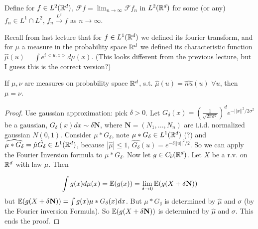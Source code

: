 \documentclass[a4paper]{article}
\begin{document}
Define for $f \in L^2 (\mathbb{R}^d)$, $\mathcal{F} f =\lim_{n \to \infty} \mathcal{F} f_n$ in $L^2(\mathbb{R}^d)$ for some (or any) $f_n \in L^1 \cap L^2$, $f_n \xrightarrow{L^2} f$ as $n \to \infty$.

Recall from last lecture that for $f \in L^1 (\mathbb{R}^d)$ we defined its fourier transform, and for $\mu$ a measure in the probability space $\mathbb{R}^d$ we defined its characteristic function $\hat{\mu}(u) = \int e^{i<u,x>} d\mu(x)$. (This looks different from the previous lecture, but I guess this is the correct version?)

\begin{prop}
If $\mu,\nu$ are measures on probability space $\mathbb{R}^d$, s.t. $\hat{\mu}(u) = \hat{nu}(u)$ $\forall u$, then $\mu = \nu$.
\begin{proof}
Use gaussian approximation: pick $\delta > 0$. Let $G_\delta(x) = (\frac{1}{\sqrt{2\pi\sigma^2}})^d e^{-||x||^2 / 2\sigma^2}$ be a gaussian, $G_\delta(x) dx \sim \delta \mathbf{N}$, where $\mathbf{N} = (N_1,...,N_n)$ are i.i.d. normalized gaussian $N(0,1)$. Consider $\mu * G_\delta$, note $\mu * G_\delta \in L^1(\mathbb{R}^d)$ (?) and $\widehat{\mu*G_\delta} = \hat{\mu} \hat{G_\delta} \in L^1(\mathbb{R}^d)$, because $|\hat{\mu}| \leq 1$, $\hat{G_\delta}(u) = e^{-\delta||u||^2/2}$. So we can apply the Fourier Inversion formula to $\mu*G_\delta$. Now let $g \in C_b(\mathbb{R}^d)$. Let $X$ be a r.v. on $\mathbb{R}^d$ with law $\mu$. Then

\begin{equation*}
\begin{aligned}
\int g(x) d\mu(x) = \mathbb{E}(g(x)) = \lim_{\delta \to 0} \mathbb{E}(g(X+\delta \mathbf{N}))
\end{aligned}
\end{equation*}
but $\mathbb{E}(g(X+\delta\mathbf{N})) = \int g(x) \mu * G_\delta(x) dx$. But $\mu*G_\delta$ is determined by $\hat{\mu}$ and $\sigma$ (by the Fourier inversion Formula). So $\mathbb{E}(g(X+\delta \mathbf{N}))$ is determined by $\hat{\mu}$ and $\sigma$. This ends the proof.
\end{proof}
\end{prop}
\end{document}
